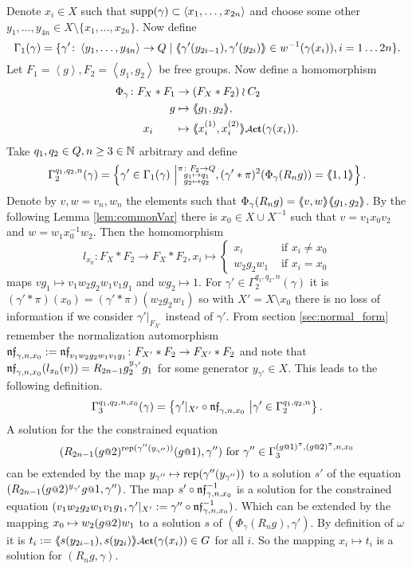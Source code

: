 \documentclass[a4paper,11pt]{amsart}
\begin{document}
 Denote $x_i\in X$ such that $\textup{supp}(\gamma) \subset \left<x_1,\ldots,x_{2n}\right>$ and choose some 
 other $y_1,\ldots,y_{4n} \in X \setminus \{x_1,\ldots,x_{2n}\}$. 
 Now define
 \[\Gamma_1(\gamma) = \{\gamma' \colon \left< y_1,\ldots ,y_{4n}\right> \to Q \mid \langle\negthickspace\langle\gamma'(y_{2i-1}),\gamma'(y_{2i})\rangle\negthickspace\rangle\in w^{-1}(\gamma(x_i)),i=1\ldots2n\}.\] 
 Let $F_1=\left<g\right>,F_2=\left<g_1,g_2\right>$ be free groups. 
 Now define a homomorphism  
 \begin{align*}
  \Phi_{\gamma}\colon F_X*F_1 &\to (F_X*F_2)\wr C_2 \\ g&\mapsto \pair{g_1,g_2},\\ x_i\qquad &\mapsto \pair{x_i^{(1)},x_i^{(2)}}\act(\gamma(x_i)).
 \end{align*}
Take $q_1,q_2 \in Q,n\geq3\in \mathbb{N}$ arbitrary and define
 \[\Gamma_2^{q_1,q_2,n}(\gamma) = \left\{\gamma'\in \Gamma_1(\gamma) \ \middle \vert \substack{\pi\colon F_2\to Q\\
										g_1\mapsto q_1 \\
										g_2\mapsto q_2 }, (\gamma'*\pi)^2(\Phi_\gamma(R_ng))=\langle\negthickspace\langle1,1\rangle\negthickspace\rangle\right\}.\] 
 Denote by $v,w=v_n,w_n$ the elements such that $\Phi_\gamma(R_ng)=\langle\negthickspace\langle v,w\rangle\negthickspace\rangle\langle\negthickspace\langle g_1,g_2\rangle\negthickspace\rangle$. By the following Lemma \ref{lem:commonVar} there is 
 $x_0 \in X\cup X^{-1}$ such that $v=v_1x_0v_2$ and $w=w_1x_0^{-1}w_2$. Then the homomorphism
 \[l_{x_0}\colon F_X*F_2\to F_X*F_2, x_i \mapsto \begin{cases}
						x_i &\text{ if } x_i\neq {x_0} \\
						w_2g_2w_1 &\text{ if }x_i= {x_0} 
                                             \end{cases}\]
 maps $vg_1 \mapsto v_1w_2g_2w_1v_1g_1$ and $wg_2\mapsto 1$. 
 For $\gamma'\in \Gamma_2^{q_1,q_2,n}(\gamma)$ it is $(\gamma'*\pi)(x_0)=({\gamma'*\pi})(w_2g_2w_1)$ so with $X'=X\setminus x_0$ there is no loss of information if 
 we consider $\gamma'|_{F_{X'}}$ instead of $\gamma'$.
 From section \ref{sec:normal_form} remember the normalization 
 automorphism $\mathfrak{nf}_{\gamma,n,x_0}:=\mathfrak{nf}_{v_1w_2g_2w_1v_1g_1}\colon F_{X'}*F_2 \to F_{X'}*F_2$
  and note that
 $\mathfrak{nf}_{\gamma,n,x_0}(l_{x_0}(v))=R_{2n-1}g_2^{{y_{\gamma'}}}g_1$ for some generator ${y_{\gamma'}}\in X$.
 This leads to the following definition.
 \[\Gamma_3^{q_1,q_2,n,x_0}(\gamma) = \left\{\gamma'|_{X'} \circ \mathfrak{nf}_{\gamma,n,x_0} \ \middle \vert \gamma' \in \Gamma_2^{q_1,q_2,n} \right\}.\] 
 A solution for the the constrained equation
 \[(R_{2n-1}(g\at2)^{\textup{rep}(\gamma''({y_{\gamma''}}))}(g\at1),\gamma'')\textup{ for }\gamma'' \in \Gamma_3^{(g\at{1})^\pi,(g\at{2})^\pi,n,x_0}\]
 can be 
 extended by the map ${y_{\gamma''}}\mapsto \textup{rep}(\gamma''({y_{\gamma''}}))$ to a solution $s'$ 
 of the equation $(R_{2n-1} (g\at{2})^{{y_{\gamma'}}} g\at{1},\gamma'')$. The map $s'\circ \mathfrak{nf}_{\gamma,n,x_0}^{-1}$ 
 is a solution for the constrained equation $(v_1w_2g_2w_1v_1g_1,\gamma'|_{X'}:=\gamma'' \circ \mathfrak{nf}_{\gamma,n,x_0}^{-1})$.
 Which can be extended by the mapping $x_0\mapsto w_2(g\at{2})w_1$ to a solution $s$ of $(\Phi_\gamma(R_n g),\gamma')$.
 By definition of $\omega$ it is $t_i:=\pair{s(y_{2i-1}),s(y_{2i})}\act(\gamma(x_i)) \in G$ for all $i$. So the mapping $x_i\mapsto t_i$ is a solution for $(R_ng,\gamma)$.
 
\end{document}
